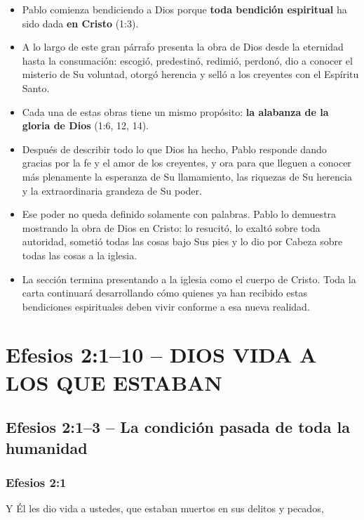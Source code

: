 \documentclass[11pt]{article}
\begin{document}
\begin{itemize}
\tightlist
\item
  Pablo comienza bendiciendo a Dios porque
  \textbf{toda bendición espiritual} ha sido dada \textbf{en Cristo}
  (1:3).
\item
  A lo largo de este gran párrafo presenta la obra de Dios desde la
  eternidad hasta la consumación: escogió, predestinó, redimió, perdonó,
  dio a conocer el misterio de Su voluntad, otorgó herencia y selló a
  los creyentes con el Espíritu Santo.
\item
  Cada una de estas obras tiene un mismo propósito:
  \textbf{la alabanza de la gloria de Dios} (1:6, 12, 14).
\item
  Después de describir todo lo que Dios ha hecho, Pablo responde dando
  gracias por la fe y el amor de los creyentes, y ora para que lleguen a
  conocer más plenamente la esperanza de Su llamamiento, las riquezas de
  Su herencia y la extraordinaria grandeza de Su poder.
\item
  Ese poder no queda definido solamente con palabras. Pablo lo demuestra
  mostrando la obra de Dios en Cristo: lo resucitó, lo exaltó sobre toda
  autoridad, sometió todas las cosas bajo Sus pies y lo dio por Cabeza
  sobre todas las cosas a la iglesia.
\item
  La sección termina presentando a la iglesia como el cuerpo de Cristo.
  Toda la carta continuará desarrollando cómo quienes ya han recibido
  estas bendiciones espirituales deben vivir conforme a esa nueva
  realidad.
\end{itemize}

\section{Efesios 2:1--10 -- DIOS VIDA A LOS QUE
ESTABAN}\label{efesios-2110-dios-vida-a-los-que-estaban}

\subsection{Efesios 2:1--3 -- La condición pasada de toda la
humanidad}\label{efesios-213-la-condiciuxf3n-pasada-de-toda-la-humanidad}

\subsubsection{Efesios 2:1}\label{efesios-21}

\begin{verseblock}
Y Él les dio vida a ustedes, que estaban muertos en sus delitos y pecados,
\end{verseblock}
\end{document}
